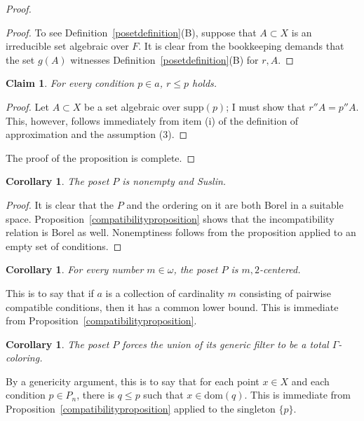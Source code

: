 \documentclass{article}
\newcommand{\gw}{\omega}
\newcommand{\supp}{\mathrm{supp}}
\newcommand{\dom}{\mathrm{dom}}
\newtheorem{claim}[theorem]{Claim}
\newtheorem{corollary}[theorem]{Corollary}
\theoremstyle{definition}
\begin{document}
\begin{proof}
\begin{proof}
To see Definition~\ref{posetdefinition}(B), suppose that $A\subset X$ is an irreducible set algebraic over $F$. It is clear from the bookkeeping demands that the set $g(A)$ witnesses  Definition~\ref{posetdefinition}(B) for $r, A$. 
\end{proof}

\begin{claim}
For every condition $p\in a$, $r\leq p$ holds.
\end{claim}

\begin{proof}
Let $A\subset X$ be a set algebraic over $\supp(p)$; I must show that $r''A=p''A$. This, however, follows immediately from item (i) of the definition of approximation and the assumption (3).
\end{proof}

\noindent The proof of the proposition is complete.
\end{proof}

\begin{corollary}
The poset $P$ is nonempty and Suslin.
\end{corollary}

\begin{proof}
It is clear that the $P$ and the ordering on it are both Borel in a suitable space. Proposition~\ref{compatibilityproposition} shows that the incompatibility relation is Borel as well. Nonemptiness follows from the proposition applied to an empty set of conditions.
\end{proof}

\begin{corollary}
For every number $m\in\gw$, the poset $P$ is $m, 2$-centered.
\end{corollary}

\noindent This is to say that if $a$ is a collection of cardinality $m$ consisting of pairwise compatible conditions, then it has a common lower bound. This is immediate from Proposition~\ref{compatibilityproposition}.

\begin{corollary}
\label{coloringcorollary}
The poset $P$ forces the union of its generic filter to be a total $\Gamma$-coloring.
\end{corollary}

\noindent By a genericity argument, this is to say that for each point $x\in X$ and each condition $p\in P_n$, there is $q\leq p$ such that $x\in\dom(q)$. This is immediate from Proposition~\ref{compatibilityproposition} applied to the singleton $\{p\}$.
\end{document}
